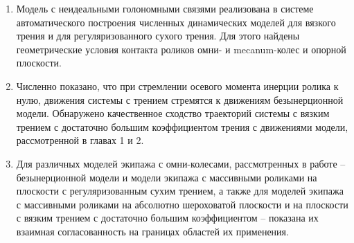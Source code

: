 \begin{enumerate}
        \item {
            Модель с неидеальными голономными связями реализована в системе автоматического построения численных динамических моделей для вязкого трения и для регуляризованного сухого трения. Для этого найдены геометрические условия контакта роликов омни- и mecanum-колес и опорной плоскости.
        }

        \item {
            Численно показано, что при стремлении осевого момента инерции ролика к нулю, движения системы с трением стремятся к движениям безынерционной модели. Обнаружено качественное сходство траекторий системы с вязким трением с достаточно большим коэффициентом трения с движениями модели, рассмотренной в главах 1 и 2.
        }

        \item {
            Для различных моделей экипажа с омни-колесами, рассмотренных в работе -- безынерционной модели и модели экипажа с массивными роликами на плоскости с регуляризованным сухим трением, а также для моделей экипажа с массивными роликами на абсолютно шероховатой плоскости и на плоскости с вязким трением с достаточно большим коэффициентом -- показана их взаимная согласованность на границах областей их применения.
        }
        





\end{enumerate}
